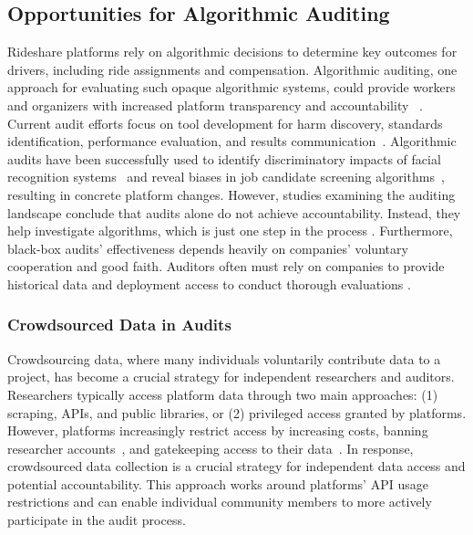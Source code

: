 \subsection{Opportunities for Algorithmic Auditing}
Rideshare platforms rely on algorithmic decisions to determine key outcomes for drivers, including ride assignments and compensation. Algorithmic auditing, one approach for evaluating such opaque algorithmic systems, could provide workers and organizers with increased platform transparency and accountability ~\cite{sandvig2014auditing}. Current audit efforts focus on tool development for harm discovery, standards identification, performance evaluation, and results communication~\cite{ojewaleAIAccountabilityInfrastructure2024}. Algorithmic audits have been successfully used to identify discriminatory impacts of facial recognition systems~\cite{buolamwini2018gender} and reveal biases in job candidate screening algorithms~\cite{wilson2021building, nagaraj2023discrimination, ali2019discrimination}, resulting in concrete platform changes. However, studies examining the auditing landscape conclude that audits alone do not achieve accountability. Instead, they help investigate algorithms, which is just one step in the process \cite{ojewaleAIAccountabilityInfrastructure2024, ParticipationScaleTensions}. Furthermore, black-box audits' effectiveness depends heavily on companies' voluntary cooperation and good faith. Auditors often must rely on companies to provide historical data and deployment access to conduct thorough evaluations \cite{casper2024black}.

\subsubsection{Crowdsourced Data in Audits}

Crowdsourcing data, where many individuals voluntarily contribute data to a project, has become a crucial strategy for independent researchers and auditors. Researchers typically access platform data through two main approaches: (1) scraping, APIs, and public libraries, or (2) privileged access granted by platforms. However, platforms increasingly restrict access by increasing costs, banning researcher accounts~\cite{edelson2021we, bruns2021after}, and gatekeeping access to their data~\cite{breuer2020practical}. In response, crowdsourced data collection is a crucial strategy for independent data access and potential accountability. This approach works around platforms' API usage restrictions and can enable individual community members to more actively participate in the audit process\cite{d2024counting,currie2016police}.

